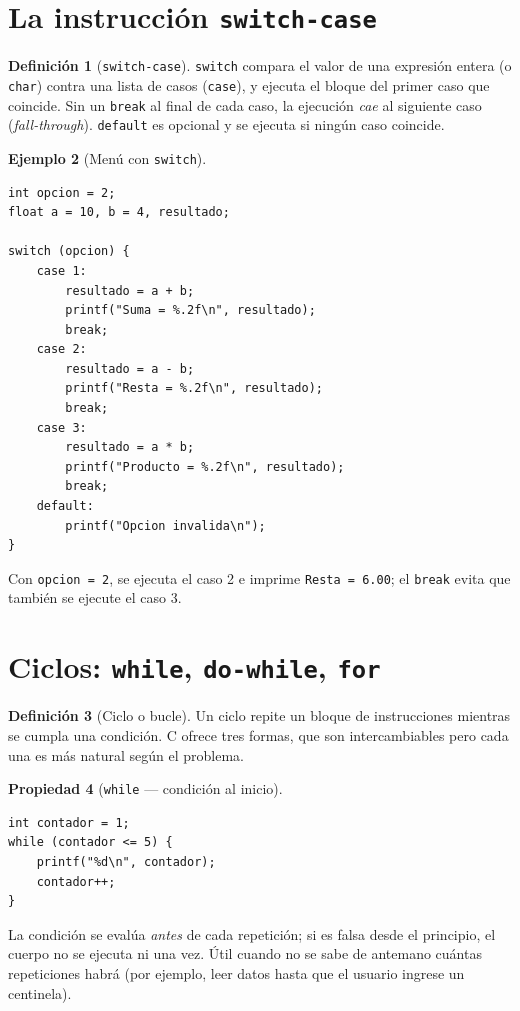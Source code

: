 \documentclass[11pt,letterpaper]{article}
\theoremstyle{definition}
\newtheorem{definicion}{Definición}[section]
\newtheorem{ejemplo}[definicion]{Ejemplo}
\newtheorem{propiedad}[definicion]{Propiedad}
\begin{document}
\section{La instrucción \texttt{switch-case}}

\begin{definicion}[\texttt{switch-case}]
\texttt{switch} compara el valor de una expresión entera (o \texttt{char}) contra una lista de
casos (\texttt{case}), y ejecuta el bloque del primer caso que coincide. Sin un \texttt{break} al
final de cada caso, la ejecución \emph{cae} al siguiente caso (\emph{fall-through}). \texttt{default}
es opcional y se ejecuta si ningún caso coincide.
\end{definicion}

\begin{ejemplo}[Menú con \texttt{switch}]
\begin{lstlisting}
int opcion = 2;
float a = 10, b = 4, resultado;

switch (opcion) {
    case 1:
        resultado = a + b;
        printf("Suma = %.2f\n", resultado);
        break;
    case 2:
        resultado = a - b;
        printf("Resta = %.2f\n", resultado);
        break;
    case 3:
        resultado = a * b;
        printf("Producto = %.2f\n", resultado);
        break;
    default:
        printf("Opcion invalida\n");
}
\end{lstlisting}
Con \texttt{opcion = 2}, se ejecuta el caso 2 e imprime \texttt{Resta = 6.00}; el \texttt{break}
evita que también se ejecute el caso 3.
\end{ejemplo}

\section{Ciclos: \texttt{while}, \texttt{do-while}, \texttt{for}}

\begin{definicion}[Ciclo o bucle]
Un ciclo repite un bloque de instrucciones mientras se cumpla una condición. C ofrece tres formas,
que son intercambiables pero cada una es más natural según el problema.
\end{definicion}

\begin{propiedad}[\texttt{while} --- condición al inicio]
\begin{lstlisting}
int contador = 1;
while (contador <= 5) {
    printf("%d\n", contador);
    contador++;
}
\end{lstlisting}
La condición se evalúa \emph{antes} de cada repetición; si es falsa desde el principio, el cuerpo
no se ejecuta ni una vez. Útil cuando no se sabe de antemano cuántas repeticiones habrá (por
ejemplo, leer datos hasta que el usuario ingrese un centinela).
\end{propiedad}
\end{document}
